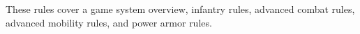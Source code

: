 These rules cover a game system overview, infantry rules, advanced combat rules, advanced mobility rules, and power armor rules.
